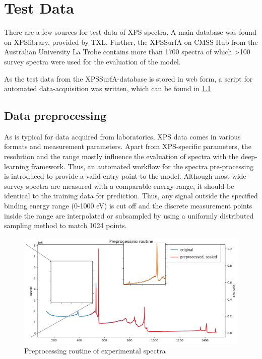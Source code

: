 \label{test_data}
\section{Test Data}

There are a few sources for test-data of XPS-spectra. A main database was found on XPSlibrary, provided by TXL. Further, the XPSSurfA on CMSS Hub from the Australian University La Trobe contains more than 1700 spectra of which >100 survey spectra were used for the evaluation of the model.

As the test data from the XPSSurfA-database is stored in web form, a script for automated data-acquisition was written, which can be found in \ref{}

\subsection{Data preprocessing}

As is typical for data acquired from laboratories, XPS data comes in various formats and measurement parameters. Apart from XPS-specific parameters, the resolution and the range mostly influence the evaluation of spectra with the deep-learning framework. Thus, an automated workflow for the spectra pre-processing is introduced to provide a valid entry point to the model.
Although most wide-survey spectra are measured with a comparable energy-range, it should be identical to the training data for prediction. Thus, any signal outside the specified binding energy range (0-1000 eV) is cut off and the discrete measurement points inside the range are interpolated or subsampled by using a uniformly distributed sampling method to match 1024 points.

\begin{figure}
    \centering
    \includegraphics[width=\textwidth]{Figures/preprocessing_routine.png}
    \caption{Preprocessing routine of experimental spectra}
    \label{fig:preproc_routine}
\end{figure}

